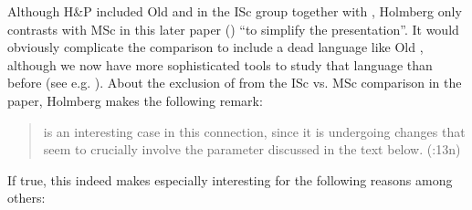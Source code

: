 \documentclass[output=paper]{LSP/langsci}
\begin{document}
Although H{\&}P included Old  and  in the ISc group together with , Holmberg only contrasts  with MSc in this later paper (\citeyear{Holmberg2010parameters}) “to simplify the presentation”. It would obviously complicate the comparison to include a dead language like Old , although we now have more sophisticated tools to study that language than before (see e.g. \citealt{Rögnvaldsson2011,RögnvaldssonEtAl2011,Thráinsson2013oldnorse}). About the exclusion of  from the ISc vs. MSc comparison in the paper, Holmberg makes the following remark:

\begin{quote}
 is an interesting case in this connection, since it is undergoing changes that seem to crucially involve the parameter discussed in the text below. (\citealt{Holmberg2010parameters}:13n)
\end{quote}

If true, this indeed makes  especially interesting for the following reasons among others:
\end{document}
